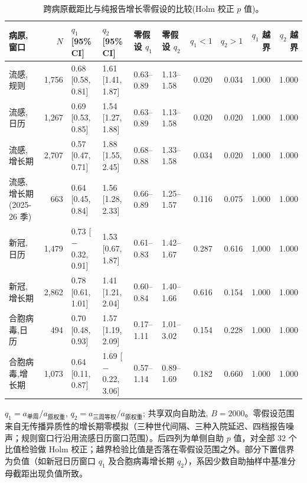 \begin{table}[htbp]
\centering
\footnotesize
\caption{跨病原截距比与纯报告增长零假设的比较(Holm 校正 $p$ 值)。}
\label{tab:s6}
\begin{tabular}{lrllllrrrr}
\toprule
病原,窗口 & $N$ & $q_1$ [95\% CI] & $q_2$ [95\% CI] & 零假设 $q_1$ & 零假设 $q_2$ & $q_1<1$ & $q_2>1$ & $q_1$ 越界 & $q_2$ 越界 \\
\midrule
流感,规则 & 1{,}756 & 0.68 [0.58, 0.81] & 1.61 [1.41, 1.87] & 0.63--0.89 & 1.13--1.58 & 0.020 & 0.034 & 1.000 & 1.000 \\
流感,日历 & 1{,}267 & 0.69 [0.53, 0.85] & 1.54 [1.27, 1.88] & 0.63--0.89 & 1.13--1.58 & 0.020 & 0.020 & 1.000 & 1.000 \\
流感,增长期 & 2{,}707 & 0.57 [0.47, 0.71] & 1.88 [1.55, 2.45] & 0.68--0.88 & 1.33--1.58 & 0.034 & 0.020 & 1.000 & 1.000 \\
流感,增长期(2025-26 季) & 663 & 0.64 [0.45, 0.84] & 1.56 [1.28, 2.33] & 0.66--0.89 & 1.25--1.57 & 0.116 & 0.075 & 1.000 & 1.000 \\
新冠,日历 & 1{,}479 & 0.73 [$-$0.32, 0.91] & 1.53 [0.67, 1.87] & 0.61--0.83 & 1.42--1.67 & 0.287 & 0.616 & 1.000 & 1.000 \\
新冠,增长期 & 2{,}862 & 0.78 [0.61, 1.01] & 1.41 [1.21, 2.04] & 0.60--0.84 & 1.40--1.66 & 0.616 & 0.154 & 1.000 & 1.000 \\
合胞病毒,日历 & 494 & 0.70 [0.48, 0.93] & 1.57 [1.19, 2.09] & 0.17--1.11 & 1.01--3.02 & 0.154 & 0.228 & 1.000 & 1.000 \\
合胞病毒,增长期 & 1{,}073 & 0.64 [0.11, 0.87] & 1.69 [$-$0.22, 3.06] & 0.57--1.14 & 0.89--1.69 & 0.182 & 0.660 & 1.000 & 1.000 \\
\bottomrule
\end{tabular}
\par\smallskip
\begin{minipage}{0.95\linewidth}\scriptsize $q_1=a_{\text{单周}}/a_{\text{原权重}}$, $q_2=a_{\text{三周等权}}/a_{\text{原权重}}$; 共享双向自助法, $B=2000$。零假设范围来自无传播异质性的增长期零模拟（三种世代间隔、三种入院延迟、四档报告噪声；规则窗口行沿用流感日历窗口范围）。后四列为单侧自助 $p$ 值，对全部 32 个比值检验做 Holm 校正；越界检验比值是否落在零假设范围之外。部分下置信界为负值（如新冠日历窗口 $q_1$ 及合胞病毒增长期 $q_2$），系因少数自助抽样中基准分母截距出现负值所致。\end{minipage}
\end{table}
